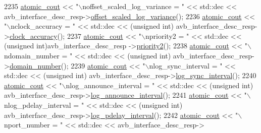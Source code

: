 \begin{DoxyCode}
2235             \hyperlink{cmd__line_8h_a0bc38ccc65c79ba06c6fcd7b4bf554c3}{atomic\_cout} << \textcolor{stringliteral}{"\(\backslash\)noffset\_scaled\_log\_variance = "} << std::dec << 
      avb\_interface\_desc\_resp->\hyperlink{classavdecc__lib_1_1avb__interface__descriptor__response_ad36916ce5037d1700c88b81901bcd972}{offset\_scaled\_log\_variance}();
2236             \hyperlink{cmd__line_8h_a0bc38ccc65c79ba06c6fcd7b4bf554c3}{atomic\_cout} << \textcolor{stringliteral}{"\(\backslash\)nclock\_accuracy = "} << std::dec << (\textcolor{keywordtype}{unsigned} int)
      avb\_interface\_desc\_resp->\hyperlink{classavdecc__lib_1_1avb__interface__descriptor__response_acc3099d6effb85acd06976886ec7e9ec}{clock\_accuracy}();
2237             \hyperlink{cmd__line_8h_a0bc38ccc65c79ba06c6fcd7b4bf554c3}{atomic\_cout} << \textcolor{stringliteral}{"\(\backslash\)npriority2 = "} << std::dec << (\textcolor{keywordtype}{unsigned} int)avb\_interface\_desc\_resp
      ->\hyperlink{classavdecc__lib_1_1avb__interface__descriptor__response_a8c7f27f9936745eaf35d7b1e3d2a312a}{priority2}();
2238             \hyperlink{cmd__line_8h_a0bc38ccc65c79ba06c6fcd7b4bf554c3}{atomic\_cout} << \textcolor{stringliteral}{"\(\backslash\)ndomain\_number = "} << std::dec << (\textcolor{keywordtype}{unsigned} int)
      avb\_interface\_desc\_resp->\hyperlink{classavdecc__lib_1_1avb__interface__descriptor__response_afe2d2e5bfaef60c810adead040d141c3}{domain\_number}();
2239             \hyperlink{cmd__line_8h_a0bc38ccc65c79ba06c6fcd7b4bf554c3}{atomic\_cout} << \textcolor{stringliteral}{"\(\backslash\)nlog\_sync\_interval = "} << std::dec << (\textcolor{keywordtype}{unsigned} int)
      avb\_interface\_desc\_resp->\hyperlink{classavdecc__lib_1_1avb__interface__descriptor__response_a7b48b137474a0b9cc94dbc77cf807921}{log\_sync\_interval}();
2240             \hyperlink{cmd__line_8h_a0bc38ccc65c79ba06c6fcd7b4bf554c3}{atomic\_cout} << \textcolor{stringliteral}{"\(\backslash\)nlog\_announce\_interval = "} << std::dec << (\textcolor{keywordtype}{unsigned} int)
      avb\_interface\_desc\_resp->\hyperlink{classavdecc__lib_1_1avb__interface__descriptor__response_aa99e9ae52d9f883d9d7128e273a74293}{log\_announce\_interval}();
2241             \hyperlink{cmd__line_8h_a0bc38ccc65c79ba06c6fcd7b4bf554c3}{atomic\_cout} << \textcolor{stringliteral}{"\(\backslash\)nlog\_pdelay\_interval = "} << std::dec << (\textcolor{keywordtype}{unsigned} int)
      avb\_interface\_desc\_resp->\hyperlink{classavdecc__lib_1_1avb__interface__descriptor__response_a641cffe922b9b057ba80fdc51a028302}{log\_pdelay\_interval}();
2242             \hyperlink{cmd__line_8h_a0bc38ccc65c79ba06c6fcd7b4bf554c3}{atomic\_cout} << \textcolor{stringliteral}{"\(\backslash\)nport\_number = "} << std::dec << avb\_interface\_desc\_resp->

\end{DoxyCode}

